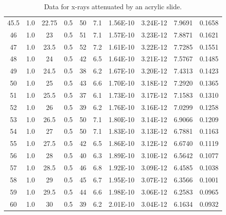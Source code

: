 \documentclass[justified]{tufte-book}
\begin{document}
\begin{table}[ht]
\begin{tabular}{cccccccccc}
45.5        & 1.0 & 22.75    & 0.5         & 50    & 7.1      & 1.56E-10      & 3.24E-12         & 7.9691       & 0.1658 \\
46        & 1.0 & 23       & 0.5         & 51    & 7.1      & 1.57E-10      & 3.23E-12         & 7.8871       & 0.1621 \\
47        & 1.0 & 23.5     & 0.5         & 52    & 7.2      & 1.61E-10      & 3.22E-12         & 7.7285       & 0.1551 \\
48        & 1.0 & 24       & 0.5         & 42    & 6.5      & 1.64E-10      & 3.21E-12         & 7.5767       & 0.1485 \\
49        & 1.0 & 24.5     & 0.5         & 38    & 6.2      & 1.67E-10      & 3.20E-12         & 7.4313       & 0.1423 \\
50        & 1.0 & 25       & 0.5         & 43    & 6.6      & 1.70E-10      & 3.18E-12         & 7.2920       & 0.1365 \\
51        & 1.0 & 25.5     & 0.5         & 37    & 6.1      & 1.73E-10      & 3.17E-12         & 7.1583       & 0.1310 \\
52        & 1.0 & 26       & 0.5         & 39    & 6.2      & 1.76E-10      & 3.16E-12         & 7.0299       & 0.1258 \\
53        & 1.0 & 26.5     & 0.5         & 50    & 7.1      & 1.80E-10      & 3.14E-12         & 6.9066       & 0.1209 \\
54        & 1.0 & 27       & 0.5         & 50    & 7.1      & 1.83E-10      & 3.13E-12         & 6.7881       & 0.1163 \\
55        & 1.0 & 27.5     & 0.5         & 42    & 6.5      & 1.86E-10      & 3.12E-12         & 6.6740       & 0.1119 \\
56        & 1.0 & 28       & 0.5         & 40    & 6.3      & 1.89E-10      & 3.10E-12         & 6.5642       & 0.1077 \\
57        & 1.0 & 28.5     & 0.5         & 46    & 6.8      & 1.92E-10      & 3.09E-12         & 6.4585       & 0.1038 \\
58        & 1.0 & 29       & 0.5         & 45    & 6.7      & 1.95E-10      & 3.07E-12         & 6.3566       & 0.1001 \\
59        & 1.0 & 29.5     & 0.5         & 44    & 6.6      & 1.98E-10      & 3.06E-12         & 6.2583       & 0.0965 \\
60        & 1.0 & 30       & 0.5         & 39    & 6.2      & 2.01E-10      & 3.04E-12         & 6.1634       & 0.0932 \\
\end{tabular}
\caption{Data for x-rays attenuated by an acrylic slide.}
\label{tab:xrcg4}
\end{table}
\end{document}
